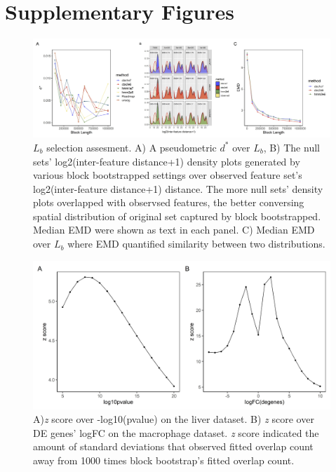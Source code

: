 \documentclass{article}
\begin{document}
\section{Supplementary Figures}
\begin{figure}[htbp]
\centering
\includegraphics[scale=0.35]{Figures/sfig1.jpeg}
\caption{$L_b$ selection assesment. A) A pseudometric $d^*$ over $L_b$, B) The null sets' log2(inter-feature distance+1) density plots generated by various block bootstrapped settings over observed feature set's log2(inter-feature distance+1) distance. The more null sets' density plots overlapped with observsed features, the better conversing spatial distribution of original set captured by block bootstrapped. Median EMD were shown as text in each panel. C) Median EMD over $L_b$ where EMD quantified similarity between two distributions. } 
\label{fig:suppfig0}
\end{figure}

\begin{figure}[htbp]
\centering
\includegraphics[scale=0.3]{Figures/zscore.jpeg}
\caption{ A)\textit{z} score over -log10(pvalue) on the liver dataset. B) \textit{z} score over DE genes' logFC on the macrophage dataset. \textit{z} score indicated the amount of standard deviations that observed fitted overlap count away from 1000 times block bootstrap's fitted overlap count.} 
\label{fig:suppfig2}
\end{figure}
\end{document}
